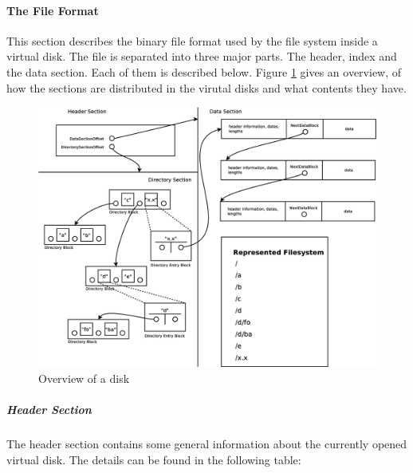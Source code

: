 \paragraph{The File Format}\label{sec:file_format}
This section describes the binary file format used by the file system inside a
virtual disk. The file is separated into three major parts. The header, index
and the data section. Each of them is described below. Figure
\ref{fig:disk_overview} gives an overview, of how the sections are distributed
in the virutal disks and what contents they have.

\begin{figure}[h!]
\centering
\includegraphics[width=1\textwidth]{figures/fileFormat.eps}
\caption{Overview of a disk}
\label{fig:disk_overview}
\end{figure}

\subparagraph{Header Section} The header section contains some general information
about the currently opened virtual disk. The details can be found in the
following table:

